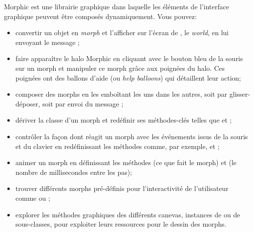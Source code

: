 \documentclass[a4paper,10pt,twoside]{book}
\begin{document}
Morphic est une librairie graphique dans laquelle les éléments de
l'interface graphique peuvent être composés dynamiquement.
Vous pouvez:
\begin{itemize}
  \item convertir un objet en \emph{morph} et l'afficher
    sur l'écran de \sq, le \emph{world}, en lui envoyant le message
    ;
  \item faire apparaître le halo Morphic en cliquant avec le
    bouton bleu de la souris sur un morph et manipuler ce morph
    grâce aux poignées du halo. Ces poignées ont des ballons
    d'aide (ou \emph{help balloons}) qui détaillent leur action;
  \item composer des morphs en les emboîtant les uns dans les autres,
    soit par glisser-déposer, soit par envoi du message ;
  \item dériver la classe d'un morph et redéfinir ses
    méthodes-clés telles que  et ;
  \item contrôler la façon dont réagit un morph avec les
    événements issus de la souris et du clavier en redéfinissant les
    méthodes comme, par exemple,  et
    ;
  \item animer un morph en définissant les méthodes 
    (ce que fait le morph) et  (le nombre de
    millisecondes entre les pas);
  \item trouver différents morphs pré-définis pour
    l'interactivité de l'utilisateur comme
     ou ;
  \item explorer les méthodes graphiques des différents canevas,
    instances de  ou de sous-classes,
    pour exploiter leurs ressources pour le dessin des morphs.
\end{itemize}

\ifx\wholebook\relax\else
\end{document}

